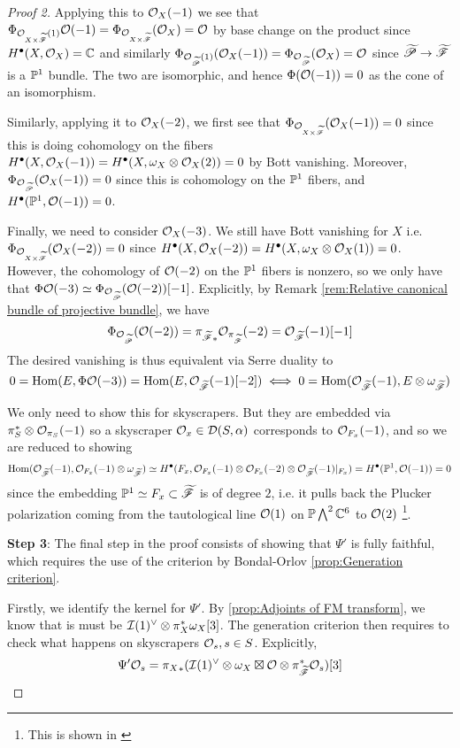 \begin{proof}[Proof 2]
Applying this to $\O_X(-1)$ we see that $\Phi_{\O_{X\times \tscrF}(1)}\O(-1)=\Phi_{\O_{X\times \tscrF}}(\O_X)=\O$ by base change on the product since $H^\bullet(X, \O_X)=\C$ and similarly $\Phi_{\O_{\tscrP}(1)}(\O_X(-1))=\Phi_{\O_{\tscrP}}(\O_X)=\O$ since $\tscrP\rightarrow \tscrF$ is a $\P^1$ bundle. The two are isomorphic, and hence $\Phi(\O(-1))=0$ as the cone of an isomorphism.

Similarly, applying it to $\O_X(-2)$, we first see that $\Phi_{\O_{X\times \tscrF}}(\O_X(-1))=0$ since this is doing cohomology on the fibers $H^\bullet(X, \O_X(-1))=H^\bullet(X, \omega_X \otimes \O_X(2))=0$ by Bott vanishing. Moreover, $\Phi_{\O_{\tscrP}}(\O_X(-1))=0$ since this is cohomology on the $\P^1$ fibers, and $H^\bullet(\P^1, \O(-1))=0$.

Finally, we need to consider $\O_X(-3)$. We still have Bott vanishing for $X$ i.e. $\Phi_{\O_{X\times \tscrF}}(\O_X(-2))=0$ since $H^\bullet(X, \O_X(-2))=H^\bullet(X, \omega_X \otimes \O_X(1))=0$. However, the cohomology of $\O(-2)$ on the $\P^1$ fibers is nonzero, so we only have that $\Phi \O(-3)\simeq \Phi_{\O_{\tscrP}}(\O(-2))[-1]$. Explicitly, by Remark \ref{rem:Relative canonical bundle of projective bundle}, we have 
$$\Phi_{\O_{\tscrP}}(\O(-2))={\pi_{\tscrF}}_* \O_{\pi_{\tscrF}}(-2)=\O_{\tscrF} (-1)[-1]$$
The desired vanishing is thus equivalent via Serre duality to $$0 = \Hom(E, \Phi \O(-3))=\Hom(E, \O_{\tscrF} (-1)[-2])\iff 0=\Hom(\O_{\tscrF} (-1), E\otimes \omega_{\tscrF})$$

We only need to show this for skyscrapers. But they are embedded via $\pi_S^* \otimes \O_{\pi_S}(-1)$ so a skyscraper $\O_x \in \calD(S,\alpha)$ corresponds to $\O_{F_x}(-1)$, and so we are reduced to showing $$\Hom(\O_{\tscrF}(-1), \O_{F_x}(-1)\otimes\omega_{\tscrF})\simeq H^\bullet(F_x, \O_{F_x}(-1) \otimes \O_{F_x}(-2)\otimes \O_{\tscrF}(-1)|_{F_x})=H^\bullet(\P^1, \O(-1))=0$$since the embedding $\P^1 \simeq F_x \subset \tscrF$ is of degree $2$, i.e. it pulls back the Plucker polarization coming from the tautological line $\O(1)$ on $\P \bigwedge^2 \mathbb{C}^6$ to $\O(2)$ \footnote{This is shown in \cite[\S1]{huybrechts_geometry_2023}}.

\textbf{Step 3}: The final step in the proof consists of showing that $\Psi'$ is fully faithful, which requires the use of the criterion by Bondal-Orlov \ref{prop:Generation criterion}. 

Firstly, we identify the kernel for $\Psi'$. By \ref{prop:Adjoints of FM transform}, we know that is must be $\calI(1)^\vee \otimes \pi_X^* \omega_X [3]$. The generation criterion then requires to check what happens on skyscrapers $\O_s, s\in S$. Explicitly, $$\Psi'\O_s={\pi_X}_* ( \calI(1)^\vee \otimes \omega_X \boxtimes \O \otimes \pi_{\tscrF}^*\O_s)[3]$$


\end{proof}
